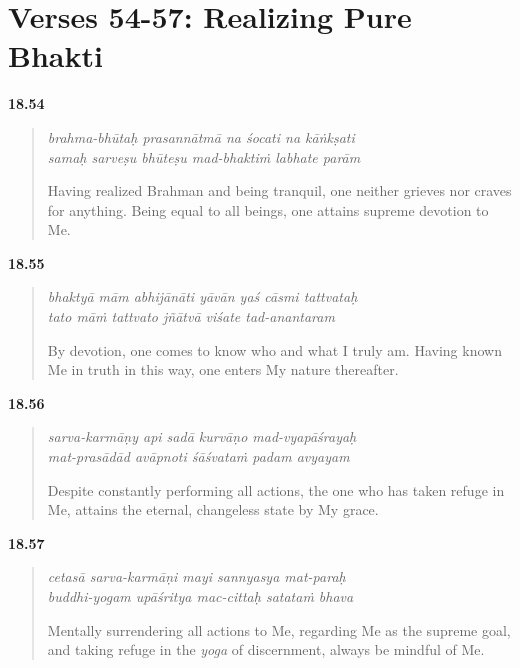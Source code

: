 \section{Verses 54-57: Realizing Pure Bhakti}\label{sec-verses-54-57-realizing-pure-bhakti}


\par\noindent\textbf{18.54}\par
\begin{verse}
\textit{brahma-bhūtaḥ prasannātmā na śocati na kāṅkṣati} \\
\textit{samaḥ sarveṣu bhūteṣu mad-bhaktiṁ labhate parām}

\noindent Having realized Brahman and being tranquil, one neither grieves nor craves for anything. Being equal to all beings, one attains supreme devotion to Me.
\end{verse}
\par



\par\noindent\textbf{18.55}\par
\begin{verse}
\textit{bhaktyā mām abhijānāti yāvān yaś cāsmi tattvataḥ} \\
\textit{tato māṁ tattvato jñātvā viśate tad-anantaram}

\noindent By devotion, one comes to know who and what I truly am. Having known Me in truth in this way, one enters My nature thereafter.
\end{verse}
\par



\par\noindent\textbf{18.56}\par
\begin{verse}
\textit{sarva-karmāṇy api sadā kurvāṇo mad-vyapāśrayaḥ} \\
\textit{mat-prasādād avāpnoti śāśvataṁ padam avyayam}

\noindent Despite constantly performing all actions, the one who has taken refuge in Me, attains the eternal, changeless state by My grace.
\end{verse}
\par



\par\noindent\textbf{18.57}\par
\begin{verse}
\textit{cetasā sarva-karmāṇi mayi sannyasya mat-paraḥ} \\
\textit{buddhi-yogam upāśritya mac-cittaḥ satataṁ bhava}

\noindent Mentally surrendering all actions to Me, regarding Me as the supreme goal, and taking refuge in the \textit{yoga} of discernment, always be mindful of Me.
\end{verse}
\par


